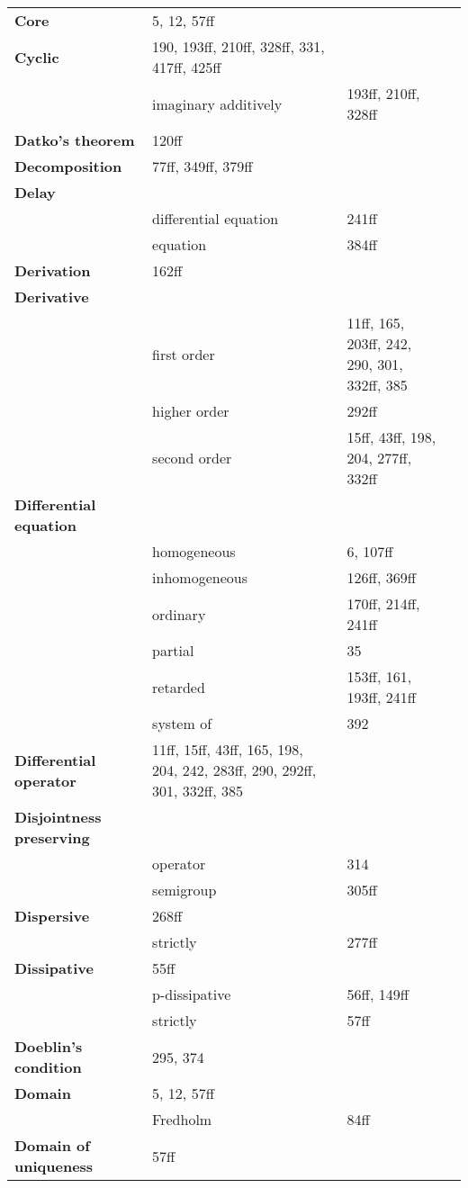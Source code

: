 \documentclass[10pt]{scrartcl}
\begin{document}
\begin{longtable}{>{\bfseries}p{5cm}p{4cm}p{4cm}p{4cm}}
Core 	& 5, 12, 57ff \\

Cyclic 	& 190, 193ff, 210ff, 328ff, 331, 417ff, 425ff \\
	& imaginary additively 	& 193ff, 210ff, 328ff \\

Datko's theorem 	& 120ff \\

Decomposition 	& 77ff, 349ff, 379ff \\

Delay 	& \\
	& differential equation 	& 241ff \\
	& equation 	& 384ff \\

Derivation 	& 162ff \\

Derivative 	& \\
	& first order 	& 11ff, 165, 203ff, 242, 290, 301, 332ff, 385 \\
	& higher order 	& 292ff \\
	& second order 	& 15ff, 43ff, 198, 204, 277ff, 332ff \\

Differential equation 	& \\
	& homogeneous 	& 6, 107ff \\
	& inhomogeneous 	& 126ff, 369ff \\
	& ordinary 	& 170ff, 214ff, 241ff \\
	& partial 	& 35 \\
	& retarded 	& 153ff, 161, 193ff, 241ff \\
	& system of 	& 392 \\

Differential operator 	& 11ff, 15ff, 43ff, 165, 198, 204, 242, 283ff, 290, 292ff, 301, 332ff, 385 \\

Disjointness preserving 	& \\
	& operator 	& 314 \\
	& semigroup 	& 305ff \\

Dispersive 	& 268ff \\
	& strictly 	& 277ff \\

Dissipative 	& 55ff \\
	& p-dissipative 	& 56ff, 149ff \\
	& strictly 	& 57ff \\

Doeblin's condition 	& 295, 374 \\

Domain 	& 5, 12, 57ff \\
	& Fredholm 	& 84ff \\

Domain of uniqueness 	& 57ff \\

\end{longtable}
\end{document}
